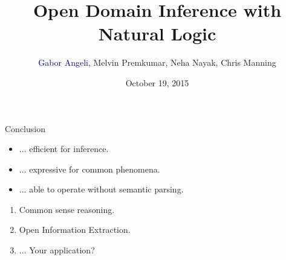 \documentclass[hyperref,xcolor=table]{beamer}
\title{Open Domain Inference with Natural Logic}
\subtitle{}
\author{\textcolor{darkblue}{Gabor Angeli}, Melvin Premkumar, Neha Nayak, Chris Manning}
\date{October 19, 2015}
\institute[Stanford]{Stanford University}
\begin{document}
\begin{frame}
  \titlepage
\end{frame}








\begin{frame}{Conclusion}
\begin{itemize}
\item $\dots$ efficient for inference.
\item $\dots$ expressive for common phenomena.
\item $\dots$ able to operate without semantic parsing.
\end{itemize}
\vspace{2ex}

\begin{enumerate}
\item Common sense reasoning.
\item Open Information Extraction.
\item $\dots$ Your application?
\end{enumerate}
\vspace{2ex}

\begin{center}
\end{center}
\end{frame}


\end{document}

